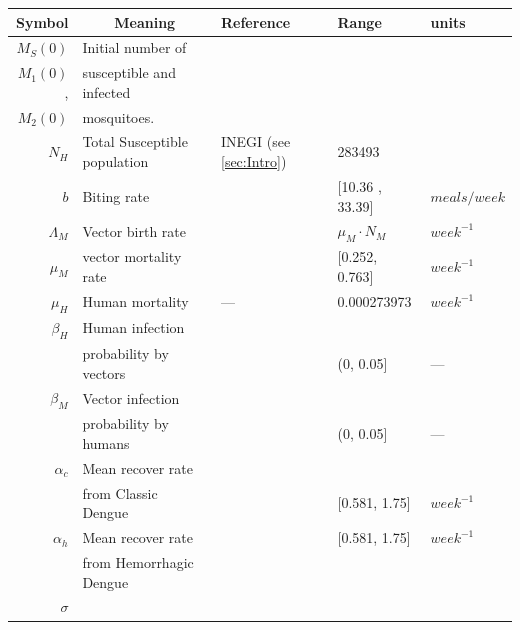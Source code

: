 
\begin{table}[htb]
		\begin{tabular}{rl m{1.9cm} ll}
			\toprule
			Symbol		&	\multicolumn{1}{c}{Meaning} &
				Reference	& Range & units
		\\
		\midrule
			$M_S(0)$
				& Initial number of 
		\\
			$M_1(0)$,
				& susceptible and infected
		\\
		    $M_2(0)$
		    &  mosquitoes.
		\\
		$N_H$
		    & Total Susceptible population
		    &  INEGI (see \cref{sec:Intro})
		    & \num{283493}
		\\
			$b$
			& Biting rate
			&\cite{YasunoM1990}
			&[10.36 , 33.39] & $\si{meals \per week}$ 
		\\
			$\Lambda_M$
			& Vector birth rate
			&
			& $\mu_M \cdot N_M$
			& $\si{week^{-1}}$
		\\
			$\mu_M$
			& vector mortality rate
			& \cite{YANG2009}
            & [\num{0.252}, \num{0.763}] 
            & $\si{week^{-1}}$
    \\
			$\mu_H$
			& Human mortality
			&---
			& \num{0.000273973} 
			& $\si{week^{-1}}$
		\\
			$\beta_H$ 
			&	Human infection 
			\\
      & probability  by vectors
			& \cite{Feng1997a} 
			& (\num{0}, \num{0.05}] 
			& ---
		\\
			$\beta_M$
			& Vector infection 
			\\
      & probability by humans
			& \cite{Feng1997a}& (\num{0}, \num{0.05}] & ---
		\\
			$\alpha_{c}$ 
			& Mean recover rate 
			\\
      & from Classic Dengue
			&\cite{Pinho2010}
			& [\num{0.581}, \num{1.75}] & $\si{week^{-1}}$
		\\
			$\alpha_{h}$	& Mean recover rate
			& \cite{Pinho2010} 
			& [\num{0.581}, \num{1.75}] 
			& $\si{week^{-1}}$
		\\
			& from Hemorrhagic Dengue
		\\
			$\sigma$

\end{tabular}
\end{table}
